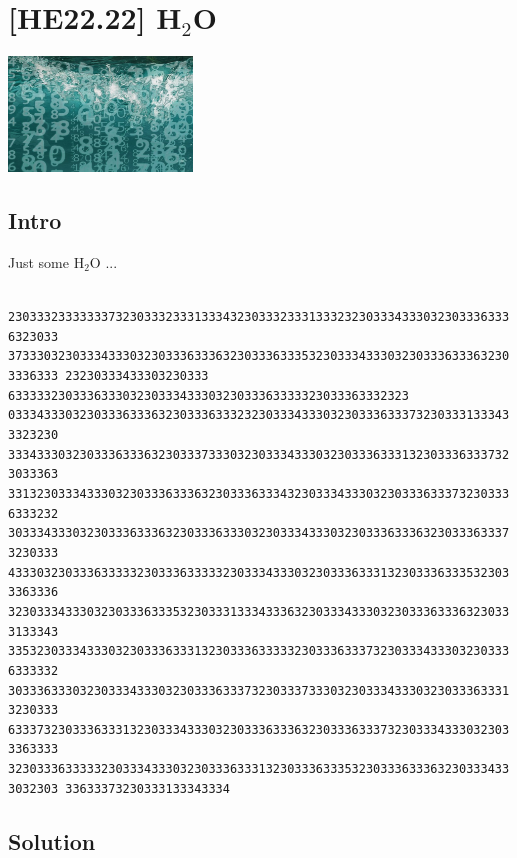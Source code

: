 
\hypertarget{he22.22}{%
\chapter{%
\texorpdfstring{[HE22.22] H$_2$O}{[HE22.22] H2O}}\label{he22.22}}

\begin{marginfigure}
	\includegraphics[width=49mm]{level6/challenge22.jpg}
\end{marginfigure}
\section{Intro}
Just some H$_2$O ...

\begin{fullwidth}
\texttt{
23033323333333732303332333133343230333233313332323033343330323033363336323033
37333032303334333032303336333632303336333532303334333032303336333632303336333
23230333433303230333 63333323033363330323033343330323033363333323033363332323
03334333032303336333632303336333232303334333032303336333732303331333433323230
33343330323033363336323033373330323033343330323033363331323033363337323033363
33132303334333032303336333632303336333432303334333032303336333732303336333232
30333433303230333633363230333633303230333433303230333633363230333633373230333
43330323033363333323033363333323033343330323033363331323033363335323033363336
32303334333032303336333532303331333433363230333433303230333633363230333133343
33532303334333032303336333132303336333332303336333732303334333032303336333332
30333633303230333433303230333633373230333733303230333433303230333633313230333
63337323033363331323033343330323033363336323033363337323033343330323033363333
32303336333332303334333032303336333132303336333532303336333632303334333032303
33633373230333133343334
}
\end{fullwidth}

\section{Solution}\label{hv22.22solution}

